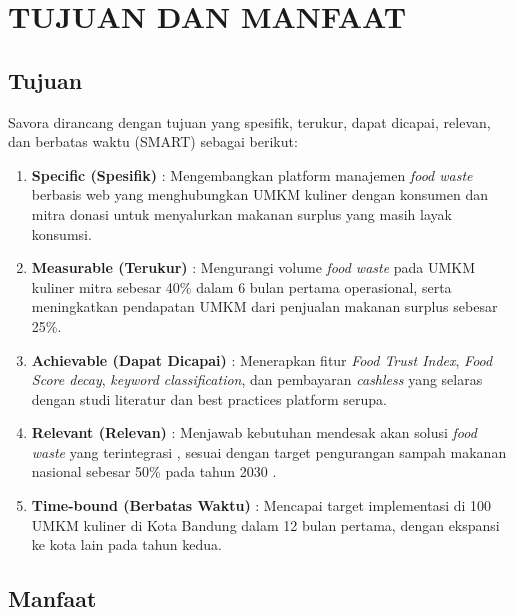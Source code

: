 \section{TUJUAN DAN MANFAAT}

\subsection{Tujuan}

Savora dirancang dengan tujuan yang spesifik, terukur, dapat dicapai, relevan, dan berbatas waktu (SMART) sebagai berikut:

\begin{enumerate}[leftmargin=*]
    \item \textbf{Specific (Spesifik)} : Mengembangkan platform manajemen \textit{food waste} berbasis web yang menghubungkan UMKM kuliner dengan konsumen dan mitra donasi untuk menyalurkan makanan surplus yang masih layak konsumsi.
    
    \item \textbf{Measurable (Terukur)} : Mengurangi volume \textit{food waste} pada UMKM kuliner mitra sebesar 40\% dalam 6 bulan pertama operasional, serta meningkatkan pendapatan UMKM dari penjualan makanan surplus sebesar 25\%.
    
    \item \textbf{Achievable (Dapat Dicapai)} : Menerapkan fitur \textit{Food Trust Index}, \textit{Food Score decay}, \textit{keyword classification}, dan pembayaran \textit{cashless} yang selaras dengan studi literatur \cite{kusumawati2025mobile}\cite{qlearning2026pricing} dan best practices platform serupa.
    
    \item \textbf{Relevant (Relevan)} : Menjawab kebutuhan mendesak akan solusi \textit{food waste} yang terintegrasi \cite{mobilefoodwaste2024review}, sesuai dengan target pengurangan sampah makanan nasional sebesar 50\% pada tahun 2030 \cite{unsdg2024}.
    
    \item \textbf{Time-bound (Berbatas Waktu)} : Mencapai target implementasi di 100 UMKM kuliner di Kota Bandung dalam 12 bulan pertama, dengan ekspansi ke kota lain pada tahun kedua.
\end{enumerate}

\subsection{Manfaat}

